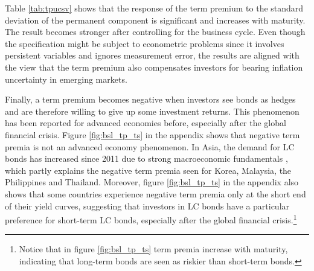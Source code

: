 {Table \ref{tab:tpucsv} shows that the response of the term premium to the standard deviation of the permanent component is significant %
and increases with maturity.
The result becomes stronger after controlling for the business cycle. 
Even though the specification might be subject to econometric problems since it involves persistent variables and ignores measurement error,
the results are %
aligned with the view that the term premium also compensates investors for bearing inflation uncertainty in emerging markets.




Finally, a term premium becomes negative when investors see bonds as hedges and are therefore willing to give up some investment returns. 
This phenomenon has been reported for advanced economies before, especially after the global financial crisis.
Figure \ref{fig:bsl_tp_ts} in the appendix shows that negative term premia is not an advanced economy phenomenon.
In Asia, the demand for LC bonds has increased since 2011 due to strong macroeconomic fundamentals \citep{IMFWB:2020}, which partly explains the negative term premia seen for Korea, Malaysia, the Philippines and Thailand.
Moreover,
figure \ref{fig:bsl_tp_ts} in the appendix also shows that some countries experience negative term premia only at the short end of their yield curves, %
suggesting that %
investors in LC bonds %
have a particular preference for short-term LC bonds, especially after the global financial crisis.\footnote{ Notice that in figure \ref{fig:bsl_tp_ts} term premia increase with maturity, indicating that long-term bonds are seen as riskier than short-term bonds.}

}
